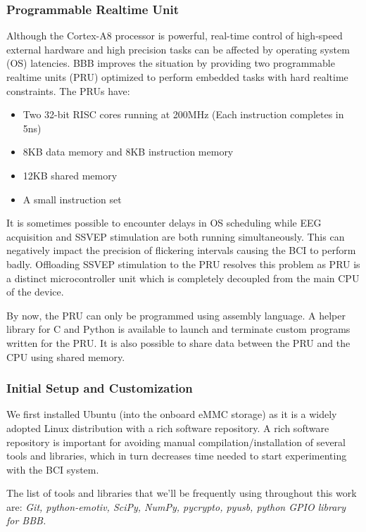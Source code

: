 \documentclass[12pt]{article}
\newcommand\mysubsubsection[1]{\subsubsection{#1}}
\numberwithin{equation}{section}
\numberwithin{figure}{section}
\numberwithin{table}{section}
\begin{document}
\mysubsubsection{Programmable Realtime Unit}\label{seq:embeddedcomputer_bbb_pru}
\par{
    Although the Cortex-A8 processor is powerful, real-time control of high-speed external hardware
    and high precision tasks can be affected by operating system (OS) latencies. BBB improves the
    situation by providing two programmable realtime units (PRU) optimized to perform embedded tasks
    with hard realtime constraints. The PRUs have:
    \begin{itemize}
        \item Two 32-bit RISC cores running at 200MHz (Each instruction completes in 5ns)
        \item 8KB data memory and 8KB instruction memory
        \item 12KB shared memory
        \item A small instruction set
    \end{itemize}
    It is sometimes possible to encounter delays in OS scheduling while EEG
    acquisition and SSVEP stimulation are both running simultaneously. This can negatively
    impact the precision of flickering intervals causing the BCI to perform badly.
    Offloading SSVEP stimulation to the PRU resolves this problem as PRU is a distinct
    microcontroller unit which is completely decoupled from the main CPU of the device.
}
\par{
    By now, the PRU can only be programmed using assembly language. A helper library
    for C and Python is available to launch and terminate custom programs written for the PRU.
    It is also possible to share data between the PRU and the CPU using shared memory.
}

\mysubsubsection{Initial Setup and Customization}\label{seq:embeddedcomputer_initialsetup}
\par{
We first installed Ubuntu (into the onboard eMMC storage) as it is a widely adopted Linux distribution with a rich software repository. A rich software repository is important for avoiding 
manual compilation/installation of several tools and libraries, which in turn decreases time needed to start experimenting with the BCI system.
}

\par{
The list of tools and libraries that we'll be frequently using throughout this work are: {\em Git, python-emotiv, SciPy, NumPy, pycrypto, pyusb, python GPIO library for BBB.}
}
\end{document}
